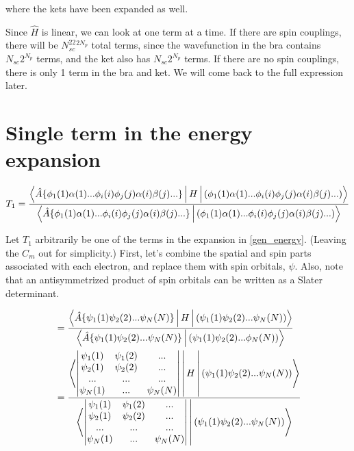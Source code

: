 \documentclass[a4paper]{article}
\begin{document}
where the kets have been expanded as well.

Since $\hat{H}$ is linear, we can look at one term at a time. If there are spin couplings, there will be $N_{sc}^22^{2N_{p}}$ total terms, since the wavefunction in the bra contains $N_{sc}2^{N_{p}}$ terms, and the ket also has  $N_{sc}2^{N_{p}}$ terms. If there are no spin couplings, there is only 1 term in the bra and ket. We will come back to the full expression later.

\section{Single term in the energy expansion}

\begin{equation}
 \begin{aligned}
 T_1 = \frac{\Braket{\hat{A} \{ \phi_1(1)\alpha(1)... \phi_i(i) \phi_j(j) \alpha(i)\beta(j)... \}
     |H|  ( \phi_1(1)\alpha(1)... \phi_i(i) \phi_j(j) \alpha(i)\beta(j)...)
     }}{\Braket{\hat{A} \{ \phi_1(1)\alpha(1)... \phi_i(i) \phi_j(j) \alpha(i)\beta(j)... \}
     |  ( \phi_1(1)\alpha(1)... \phi_i(i) \phi_j(j) \alpha(i)\beta(j)...)
    }} 
    \label{t1}
     \end{aligned}
     \end{equation}

Let $T_1$ arbitrarily be one of the terms in the expansion in \ref{gen_energy}. (Leaving the $C_m$ out for simplicity.) First, let's combine the spatial and spin parts associated with each electron, and replace them with spin orbitals, $\psi$. 
Also, note that an antisymmetrized product of spin orbitals can be written as a Slater determinant.

\begin{equation}
 \begin{aligned}
  &=\frac{\Braket{\hat{A} \{ \psi_1(1)\psi_2(2)...\psi_N(N) \}
     |H|  (\psi_1(1)\psi_2(2)...\psi_N(N))
     }}{\Braket{\hat{A} \{ \psi_1(1)\psi_2(2)...\psi_N(N) \}
     |  ( \psi_1(1)\psi_2(2)...\phi_N(N))
    }} \\
    &=\frac{\Braket{ 
    \begin{vmatrix} \psi_1(1) & \psi_1(2) & ... \\
    \psi_2(1) & \psi_2(2) & ... \\
    ... & ... & ...\\
    \psi_N(1) & ... & \psi_N(N)\\
    \end{vmatrix}
     |H|  (\psi_1(1)\psi_2(2)...\psi_N(N))
     }}{\Braket{ \begin{vmatrix} \psi_1(1) & \psi_1(2) & ... \\
    \psi_2(1) & \psi_2(2) & ... \\
    ... & ... & ...\\
    \psi_N(1) & ... & \psi_N(N)\\
    \end{vmatrix}
     |  ( \psi_1(1)\psi_2(2)...\psi_N(N))
    }}
     \end{aligned}
     \end{equation}
\end{document}
